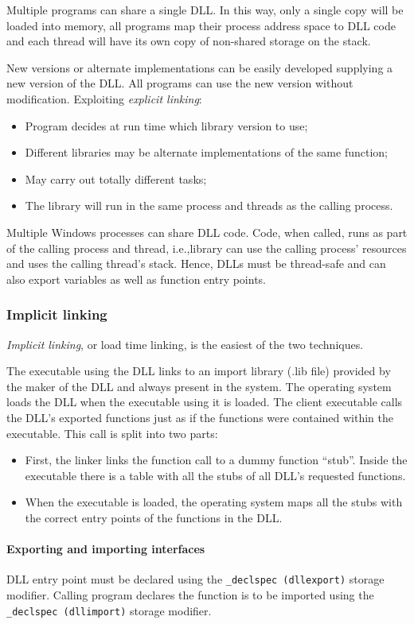 Multiple programs can share a single DLL. In this way, only a single copy will be loaded into memory, all programs map their process address space to DLL code and each thread will have its own copy of non-shared storage on the stack.

New versions or alternate implementations can be easily developed supplying a new version of the DLL. All programs can use the new version without modification. Exploiting \emph{explicit linking}:
\begin{itemize}
\item Program decides at run time which library version to use;
\item Different libraries may be alternate implementations of the same function;
\item May carry out totally different tasks;
\item The library will run in the same process and threads as the calling process.
\end{itemize}
Multiple Windows processes can share DLL code. Code, when called, runs as part of the calling process and thread, i.e.,\@ library can use the calling process' resources and uses the calling thread's stack. Hence, DLLs must be thread-safe and can also export variables as well as function entry points.

\subsubsection{Implicit linking}
\emph{Implicit linking}, or load time linking, is the easiest of the two techniques.

The executable using the DLL links to an import library (.lib file) provided by the maker of the DLL and always present in the system. The operating system loads the DLL when the executable using it is loaded. The client executable calls the DLL’s exported functions just as if the functions were contained within the executable. This call is split into two parts:
\begin{itemize}
\item First, the linker links the function call to a dummy function ``stub''. Inside the executable there is a table with all the stubs of all DLL’s requested functions.
\item When the executable is loaded, the operating system maps all the stubs with the correct
entry points of the functions in the DLL.
\end{itemize}

\paragraph{Exporting and importing interfaces}
DLL entry point must be declared using the \texttt{\_declspec (dllexport)} storage modifier. Calling program declares the function is to be imported using the \texttt{\_declspec (dllimport)} storage modifier.

